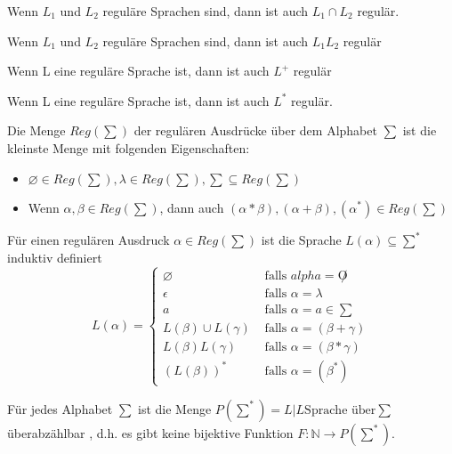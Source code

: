 \documentclass[avery5371]{flashcards}
\begin{document}
\begin{flashcard}[Satz]{ Wenn $L_1$ und $L_2$ reguläre Sprachen sind,} dann ist auch $L_1 \cap L_2$ regulär.
\end{flashcard}

\begin{flashcard}[Satz]{ Wenn $L_1$ und $L_2$ reguläre Sprachen sind,} dann ist auch $L_1L_2$ regulär
\end{flashcard}

\begin{flashcard}[Satz]{ Wenn L eine reguläre Sprache ist,} dann ist auch $L^+$ regulär
\end{flashcard}

\begin{flashcard}[Satz]{ Wenn L eine reguläre Sprache ist,} dann ist auch $L^*$ regulär.
\end{flashcard}

\begin{flashcard}[Definition]{ Die Menge $Reg(\sum)$ der regulären Ausdrücke über dem Alphabet $\sum$} ist die kleinste Menge mit folgenden Eigenschaften:\begin{itemize}
\item $\varnothing \in Reg(\sum), \lambda \in Reg(\sum), \sum \subseteq Reg(\sum)$
\item Wenn $\alpha, \beta \in Reg(\sum)$, dann auch $(\alpha * \beta), (\alpha + \beta), (\alpha^*)\in Reg(\sum)$
    \end{itemize}
\end{flashcard}

\begin{flashcard}[Definition]{ Für einen regulären Ausdruck $\alpha \in Reg(\sum)$ ist die Sprache $L(\alpha)\subseteq \sum^*$} induktiv definiert
$$L(\alpha)=\begin{cases}
\varnothing &\text{ falls } alpha=\not O \\
{\epsilon} &\text{ falls } \alpha = \lambda \\
{a} &\text{ falls } \alpha=a\in \sum \\
L(\beta)\cup L(\gamma) &\text{ falls } \alpha =(\beta + \gamma)\\
L(\beta)L(\gamma) &\text{ falls } \alpha=(\beta*\gamma)\\
(L(\beta))^* &\text{ falls } \alpha=(\beta^*)
\end{cases}$$
\end{flashcard}


\begin{flashcard}[Satz]{ Für jedes Alphabet $\sum$ ist die Menge $P(\sum^*)={L|L \text{Sprache über} \sum}$ überabzählbar}
, d.h. es gibt keine bijektive Funktion $F:\mathbb{N} \rightarrow P(\sum^*)$.
\end{flashcard}
\end{document}
